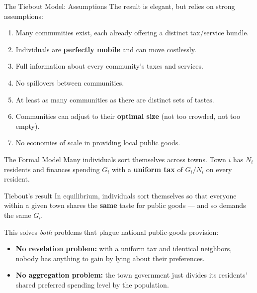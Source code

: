\documentclass[11pt,aspectratio=169]{beamer}
\begin{document}
\begin{frame}{The Tiebout Model: Assumptions}
  The result is elegant, but relies on strong assumptions:
  \begin{enumerate}
    \setlength{\itemsep}{2pt}
    \item Many communities exist, each already offering a distinct tax/service bundle.
    \item Individuals are \textbf{perfectly mobile} and can move costlessly.
    \item Full information about every community's taxes and services.
    \item No spillovers between communities.
    \item At least as many communities as there are distinct sets of tastes.
    \item Communities can adjust to their \textbf{optimal size} (not too crowded, not too empty).
    \item No economies of scale in providing local public goods.
  \end{enumerate}
\end{frame}

\begin{frame}{The Formal Model}
  Many individuals sort themselves across towns. Town $i$ has $N_i$ residents and finances spending $G_i$ with a \textbf{uniform tax} of $G_i/N_i$ on every resident.
  \begin{block}{Tiebout's result}
    In equilibrium, individuals sort themselves so that everyone within a given town shares the \textbf{same} taste for public goods --- and so demands the same $G_i$.
  \end{block}
  \small This solves \emph{both} problems that plague national public-goods provision:
  \begin{itemize}
    \item \textbf{No revelation problem:} with a uniform tax and identical neighbors, nobody has anything to gain by lying about their preferences.
    \item \textbf{No aggregation problem:} the town government just divides its residents' shared preferred spending level by the population.
  \end{itemize}
\end{frame}
\end{document}
